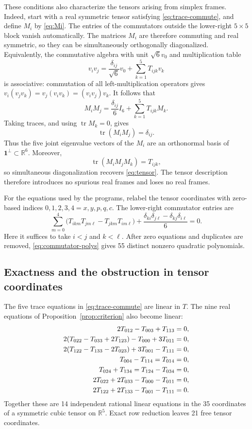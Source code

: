 \documentclass[11pt,reqno]{amsart}
\theoremstyle{remark}
\newcommand{\R}{\mathbb R}
\newcommand{\one}{\mathbf 1}
\begin{document}
These conditions also characterize the tensors arising from simplex frames.
Indeed, start with a real symmetric tensor satisfying
\eqref{eq:trace-commute}, and define $M_i$ by \eqref{eq:Mi}.  The entries of
the commutators outside the lower-right $5\times5$ block vanish automatically.
The matrices $M_i$ are therefore commuting and real symmetric, so they can be
simultaneously orthogonally diagonalized.  Equivalently, the commutative
algebra with unit $\sqrt6v_0$ and multiplication table
\[
 v_iv_j=\frac{\delta_{ij}}{\sqrt6}v_0+\sum_{k=1}^5T_{ijk}v_k
\]
is associative: commutation of all left-multiplication operators gives
$v_i(v_jv_k)=v_j(v_iv_k)=(v_iv_j)v_k$.  It follows that
\begin{equation}\label{eq:mult-identity}
 M_iM_j=\frac{\delta_{ij}}6I_6+\sum_{k=1}^5T_{ijk}M_k.
\end{equation}
Taking traces, and using $\operatorname{tr}M_k=0$, gives
\[
 \operatorname{tr}(M_iM_j)=\delta_{ij}.
\]
Thus the five joint eigenvalue vectors of the $M_i$ are an orthonormal basis
of $\one^\perp\subset\R^6$.  Moreover,
\[
 \operatorname{tr}(M_iM_jM_k)=T_{ijk},
\]
so simultaneous diagonalization recovers \eqref{eq:tensor}.  The tensor
description therefore introduces no spurious real frames and loses no real
frames.

For the equations used by the programs, relabel the tensor coordinates with
zero-based indices $0,1,2,3,4=x,y,p,q,c$.  The lower-right commutator entries
are
\begin{equation}\label{eq:commutator-polys}
 \sum_{m=0}^4
 \bigl(T_{ikm}T_{jm\ell}-T_{jkm}T_{im\ell}\bigr)
 +\frac{\delta_{ki}\delta_{j\ell}-\delta_{kj}\delta_{i\ell}}6=0.
\end{equation}
Here it suffices to take $i<j$ and $k<\ell$.  After zero equations and
duplicates are removed, \eqref{eq:commutator-polys} gives 55 distinct
nonzero quadratic polynomials.

\subsection{Exactness and the obstruction in tensor coordinates}

The five trace equations in \eqref{eq:trace-commute} are linear in $T$.
The nine real equations of Proposition~\ref{prop:criterion} also become
linear:
\begin{align}
 2T_{012}-T_{003}+T_{113}&=0,\notag\\
 2(T_{022}-T_{033}+2T_{123})-T_{000}+3T_{011}&=0,\notag\\
 2(T_{122}-T_{133}-2T_{023})+3T_{001}-T_{111}&=0,\notag\\
 T_{004}-T_{114}=T_{014}&=0,\notag\\
 T_{024}+T_{134}=T_{124}-T_{034}&=0,\notag\\
 2T_{022}+2T_{033}-T_{000}-T_{011}&=0,\notag\\
 2T_{122}+2T_{133}-T_{001}-T_{111}&=0.\label{eq:tensor-linear}
\end{align}
Together these are 14 independent rational linear equations in the 35
coordinates of a symmetric cubic tensor on $\R^5$.  Exact row reduction leaves
21 free tensor coordinates.
\end{document}
